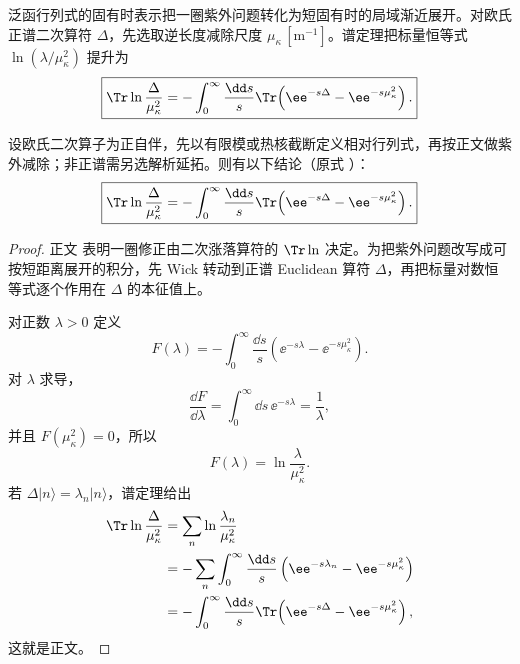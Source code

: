 泛函行列式的固有时表示把一圈紫外问题转化为短固有时的局域渐近展开。对欧氏正谱二次算符 \(\Delta\)，先选取逆长度减除尺度 \(\mu_\kappa\,[\mathrm{m^{-1}}]\)。谱定理把标量恒等式 \(\ln(\lambda/\mu_\kappa^2)\) 提升为
\begin{equation}
 \boxed{
 \Tr\ln\frac{\Delta}{\mu_\kappa^2}
 =-\int_0^\infty\frac{\dd s}{s}
 \Tr\!\left(\ee^{-s\Delta}-\ee^{-s\mu_\kappa^2}\right).}
 \label{eq:proper-time-functional-dp11}
\end{equation}

\begin{proposition}
设欧氏二次算子为正自伴，先以有限模或热核截断定义相对行列式，再按正文做紫外减除；非正谱需另选解析延拓。则有以下结论（原式 ）：
\begin{equation*}
 \boxed{
 \Tr\ln\frac{\Delta}{\mu_\kappa^2}
 =-\int_0^\infty\frac{\dd s}{s}
 \Tr\!\left(\ee^{-s\Delta}-\ee^{-s\mu_\kappa^2}\right).}
\end{equation*}
\end{proposition}
\begin{proof}
正文 表明一圈修正由二次涨落算符的 $\Tr\ln$ 决定。为把紫外问题改写成可按短距离展开的积分，先 Wick 转动到正谱 Euclidean 算符 $\Delta$，再把标量对数恒等式逐个作用在 $\Delta$ 的本征值上。

对正数 $\lambda>0$ 定义
\begin{equation*}
 F(\lambda)
 =-\int_0^\infty\frac{\dd s}{s}
 \left(\ee^{-s\lambda}-\ee^{-s\mu_\kappa^2}\right).
\end{equation*}
对 $\lambda$ 求导，
\begin{equation*}
 \frac{\dd F}{\dd\lambda}
 =\int_0^\infty\dd s\,\ee^{-s\lambda}
 =\frac1\lambda,
\end{equation*}
并且 $F(\mu_\kappa^2)=0$，所以
\begin{equation*}
 F(\lambda)=\ln\frac{\lambda}{\mu_\kappa^2}.
\end{equation*}
若 $\Delta|n\rangle=\lambda_n|n\rangle$，谱定理给出
\begin{align*}
 \Tr\ln\frac{\Delta}{\mu_\kappa^2}
 &=\sum_n\ln\frac{\lambda_n}{\mu_\kappa^2}\\
 &=-\sum_n\int_0^\infty\frac{\dd s}{s}
 \left(\ee^{-s\lambda_n}-\ee^{-s\mu_\kappa^2}\right)\\
 &=-\int_0^\infty\frac{\dd s}{s}
 \Tr\!\left(\ee^{-s\Delta}-\ee^{-s\mu_\kappa^2}\right),
\end{align*}
这就是正文。
\end{proof}


